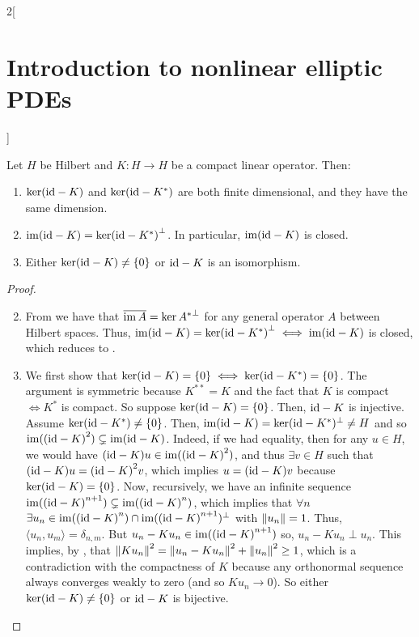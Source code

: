 \documentclass[../../../main_math.tex]{subfiles}
\begin{document}
\begin{multicols}{2}[\section{Introduction to nonlinear elliptic PDEs}]
  \begin{theorem}\label{INEPDE:fredholm}
    Let $H$ be Hilbert and $K:H\to H$ be a compact linear operator. Then:
    \begin{enumerate}
      \item $\ker(\mathrm{id}-K)$ and $\ker(\mathrm{id}-K^*)$ are both finite dimensional, and they have the same dimension.
      \item $\operatorname{im}(\mathrm{id}-K)={\ker(\mathrm{id}-K^*)}^\perp$. In particular, $\operatorname{im}(\mathrm{id}-K)$ is closed.
      \item Either $\ker(\mathrm{id}-K)\ne\{0\}$ or $\mathrm{id} -K$ is an isomorphism.
    \end{enumerate}
  \end{theorem}
  \begin{proof}
    \begin{enumerate}
      \setcounter{enumi}{1}
      \item From  we have that $\overline{\operatorname{im} A}={\ker A^*}^\perp$ for any general operator $A$ between Hilbert spaces. Thus, $\operatorname{im}(\mathrm{id}-K)={\ker(\mathrm{id}-K^*)}^\perp\iff \operatorname{im}(\mathrm{id}-K)$ is closed, which reduces to .
      \item We first show that $\ker(\mathrm{id}-K)=\{0\}\iff \ker(\mathrm{id}-K^*)=\{0\}$. The argument is symmetric because $K^{**}=K$ and the fact that $K$ is compact $\iff K^*$ is compact. So suppose $\ker(\mathrm{id}-K)=\{0\}$. Then, $\mathrm{id} -K$ is injective. Assume $\ker(\mathrm{id}-K^*)\ne\{0\}$. Then, $\operatorname{im} (\mathrm{id}-K)=\ker(\mathrm{id}-K^*)^\perp\ne H$ and so $\operatorname{im}({(\mathrm{id}-K)}^2)\subsetneq \operatorname{im}(\mathrm{id}-K)$. Indeed, if we had equality, then for any $u\in H$, we would have ${(\mathrm{id}-K)u}\in \operatorname{im}({(\mathrm{id}-K)}^2)$, and thus $\exists v\in H$ such that ${(\mathrm{id}-K)u}={(\mathrm{id}-K)}^2v$, which implies $u={(\mathrm{id}-K)}v$ because $\ker (\mathrm{id}-K)=\{0\}$. Now, recursively, we have an infinite sequence $\operatorname{im}({(\mathrm{id}-K)}^{n+1})\subsetneq \operatorname{im}({(\mathrm{id}-K)}^n)$, which implies that $\forall n$ $\exists u_n\in \operatorname{im}({(\mathrm{id}-K)}^n)\cap\operatorname{im}({(\mathrm{id}-K)}^{n+1})^\perp$ with $\left\|u_n\right\|=1$. Thus, $\langle u_n,u_m\rangle=\delta_{n,m}$. But $u_n-Ku_n\in \operatorname{im}({(\mathrm{id}-K)}^{n+1})$ so, $u_n-Ku_n\perp u_n$. This implies, by , that $\left\|Ku_n\right\|^2=\left\|u_n-Ku_n\right\|^2+\left\|u_n\right\|^2\geq 1$, which is a contradiction with the compactness of $K$ because any orthonormal sequence always converges weakly to zero (and so $Ku_n\to 0$). So either $\ker(\mathrm{id}-K)\ne\{0\}$ or $\mathrm{id}-K$ is bijective.


\end{enumerate}
\end{proof}
\end{multicols}
\end{document}
